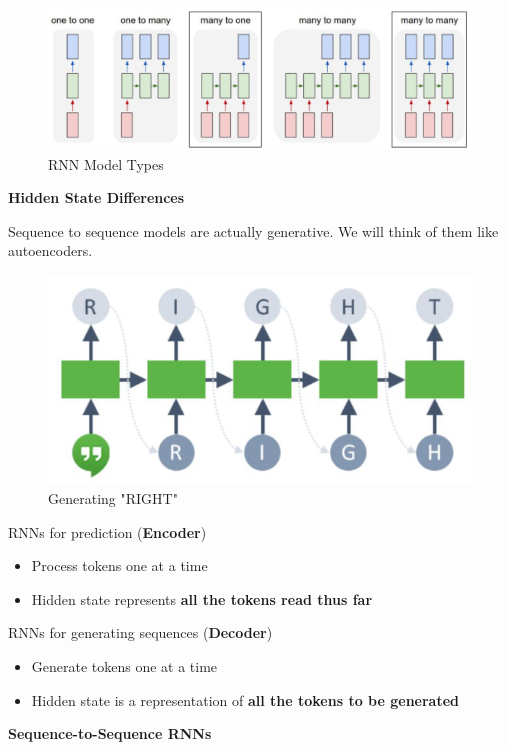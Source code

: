\begin{figure}[h!t]
    \centering
    \includegraphics[width=0.75\linewidth]{rnnmodeltypes.png}
    \caption{RNN Model Types}
    \label{fig:enter-label}
\end{figure}
\newpage

\noindent\textbf{Hidden State Differences}\\

\begin{idea}
    Sequence to sequence models are actually generative. We will think of them like autoencoders.
\end{idea}

\begin{figure}[h!t]
    \centering
    \includegraphics[width=0.65\linewidth]{right.png}
    \caption{Generating "RIGHT"}
    \label{fig:enter-label}
\end{figure}

RNNs for prediction (\textbf{Encoder})
\begin{itemize}
    \item Process tokens one at a time
    \item Hidden state represents \textbf{all the tokens read thus far}
\end{itemize}

RNNs for generating sequences (\textbf{Decoder})
\begin{itemize}
    \item Generate tokens one at a time
    \item Hidden state is a representation of \textbf{all the tokens to be generated}
\end{itemize}

\noindent \textbf{Sequence-to-Sequence RNNs}\\

